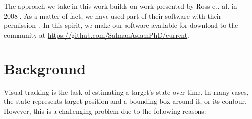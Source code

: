 The approach we take in this work builds on work presented by Ross et. al. in 2008 \cite{2008_JNL_subspaceTRK_Ross}.  As a matter of fact, we have used part of their software with their permission~\cite{2008_SFT_Ross}.  In this spirit, we make our software available for download to the community at \url{https://github.com/SalmanAslamPhD/current}.  

\section{Background}
Visual tracking is the task of estimating a target's state over time.  In many cases, the state represents target position and a bounding box around it, or its contour.  However, this is a challenging problem due to the following reasons:

